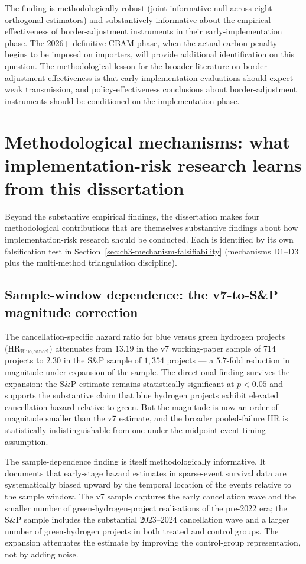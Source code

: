 The finding is methodologically robust (joint informative null across eight orthogonal estimators) and substantively informative about the empirical effectiveness of border-adjustment instruments in their early-implementation phase. The 2026+ definitive CBAM phase, when the actual carbon penalty begins to be imposed on importers, will provide additional identification on this question. The methodological lesson for the broader literature on border-adjustment effectiveness is that early-implementation evaluations should expect weak transmission, and policy-effectiveness conclusions about border-adjustment instruments should be conditioned on the implementation phase.

\section{Methodological mechanisms: what implementation-risk research learns from this dissertation}
\label{sec:ch10-methodological-mechanisms}

Beyond the substantive empirical findings, the dissertation makes four methodological contributions that are themselves substantive findings about how implementation-risk research should be conducted. Each is identified by its own falsification test in Section~\ref{sec:ch3-mechanism-falsifiability} (mechanisms D1--D3 plus the multi-method triangulation discipline).

\subsection{Sample-window dependence: the v7-to-S\&P magnitude correction}
\label{sec:ch10-sample-dependence}

The cancellation-specific hazard ratio for blue versus green hydrogen projects (HR$_{\text{Blue,cancel}}$) attenuates from $13.19$ in the v7 working-paper sample of $714$ projects to $2.30$ in the S\&P sample of $1{,}354$ projects --- a $5.7$-fold reduction in magnitude under expansion of the sample. The directional finding survives the expansion: the S\&P estimate remains statistically significant at $p < 0.05$ and supports the substantive claim that blue hydrogen projects exhibit elevated cancellation hazard relative to green. But the magnitude is now an order of magnitude smaller than the v7 estimate, and the broader pooled-failure HR is statistically indistinguishable from one under the midpoint event-timing assumption.

The sample-dependence finding is itself methodologically informative. It documents that early-stage hazard estimates in sparse-event survival data are systematically biased upward by the temporal location of the events relative to the sample window. The v7 sample captures the early cancellation wave and the smaller number of green-hydrogen-project realisations of the pre-2022 era; the S\&P sample includes the substantial 2023--2024 cancellation wave and a larger number of green-hydrogen projects in both treated and control groups. The expansion attenuates the estimate by improving the control-group representation, not by adding noise.

